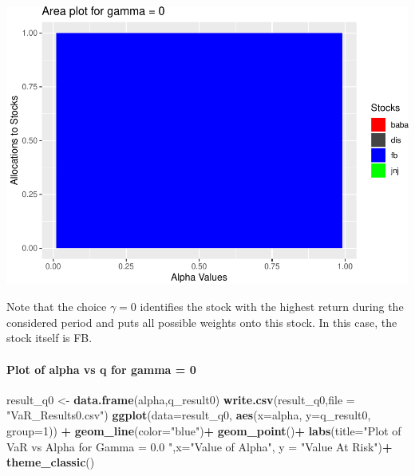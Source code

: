 \documentclass[]{article}
\newenvironment{Shaded}{\begin{snugshade}}{\end{snugshade}}
\newcommand{\KeywordTok}[1]{\textcolor[rgb]{0.13,0.29,0.53}{\textbf{#1}}}
\newcommand{\DataTypeTok}[1]{\textcolor[rgb]{0.13,0.29,0.53}{#1}}
\newcommand{\DecValTok}[1]{\textcolor[rgb]{0.00,0.00,0.81}{#1}}
\newcommand{\StringTok}[1]{\textcolor[rgb]{0.31,0.60,0.02}{#1}}
\newcommand{\OperatorTok}[1]{\textcolor[rgb]{0.81,0.36,0.00}{\textbf{#1}}}
\newcommand{\NormalTok}[1]{#1}
\let\oldparagraph\paragraph
\renewcommand{\paragraph}[1]{\oldparagraph{#1}\mbox{}}
\begin{document}
\includegraphics{Integrated_Management_Formulation_Model_files/figure-latex/unnamed-chunk-9-1.pdf}

Note that the choice \(\gamma = 0\) identifies the stock with the
highest return during the considered period and puts all possible
weights onto this stock. In this case, the stock itself is FB.

\paragraph{Plot of alpha vs q for gamma =
0}\label{plot-of-alpha-vs-q-for-gamma-0}

\begin{Shaded}
\begin{Highlighting}[]
\NormalTok{result_q0 <-}\StringTok{ }\KeywordTok{data.frame}\NormalTok{(alpha,q_result0)}
\KeywordTok{write.csv}\NormalTok{(result_q0,}\DataTypeTok{file =} \StringTok{"VaR_Results0.csv"}\NormalTok{)}
\KeywordTok{ggplot}\NormalTok{(}\DataTypeTok{data=}\NormalTok{result_q0, }\KeywordTok{aes}\NormalTok{(}\DataTypeTok{x=}\NormalTok{alpha, }\DataTypeTok{y=}\NormalTok{q_result0, }\DataTypeTok{group=}\DecValTok{1}\NormalTok{)) }\OperatorTok{+}
\StringTok{  }\KeywordTok{geom_line}\NormalTok{(}\DataTypeTok{color=}\StringTok{"blue"}\NormalTok{)}\OperatorTok{+}
\StringTok{  }\KeywordTok{geom_point}\NormalTok{()}\OperatorTok{+}
\StringTok{  }\KeywordTok{labs}\NormalTok{(}\DataTypeTok{title=}\StringTok{"Plot of VaR vs Alpha for Gamma = 0.0 "}\NormalTok{,}\DataTypeTok{x=}\StringTok{"Value of Alpha"}\NormalTok{, }\DataTypeTok{y =} \StringTok{"Value At Risk"}\NormalTok{)}\OperatorTok{+}
\StringTok{  }\KeywordTok{theme_classic}\NormalTok{()}
\end{Highlighting}
\end{Shaded}
\end{document}
